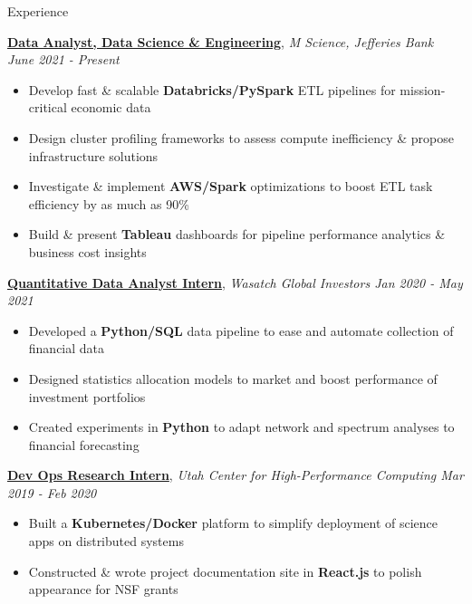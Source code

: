 \documentclass{resume/resume}
\begin{document}
\begin{rSection}{Experience}

    \href{https://mscience.com/}{\bf Data Analyst, Data Science \& Engineering}, {\em M Science, Jefferies Bank \hfill June 2021 - Present}
    \vspace{-6pt}
    \begin{itemize}[nosep]
        \item Develop fast \& scalable {\bf Databricks/PySpark} ETL pipelines for mission-critical economic data
        \item Design cluster profiling frameworks to assess compute inefficiency \& propose infrastructure solutions
        \item Investigate \& implement {\bf AWS/Spark} optimizations to boost ETL task efficiency by as much as 90\%
        \item Build \& present {\bf Tableau} dashboards for pipeline performance analytics \& business cost insights
    \end{itemize}

    \href{https://wasatchglobal.com/}{\bf Quantitative Data Analyst Intern}, {\em Wasatch Global Investors \hfill Jan 2020 - May 2021}
    \vspace{-6pt}
    \begin{itemize}[nosep]
        \item Developed a {\bf Python/SQL} data pipeline to ease and automate collection of financial data
        \item Designed statistics allocation models to market and boost performance of investment portfolios
        \item Created experiments in {\bf Python} to adapt network and spectrum analyses to financial forecasting
    \end{itemize}

    \href{https://slateci.io/}{\bf Dev Ops Research Intern}, {\em Utah Center for High-Performance Computing \hfill Mar 2019 - Feb 2020}
    \vspace{-6pt}
    \begin{itemize}[nosep]
        \item Built a {\bf Kubernetes/Docker} platform to simplify deployment of science apps on distributed systems
        \item Constructed \& wrote project documentation site in {\bf React.js} to polish appearance for NSF grants
    \end{itemize}
    

\end{rSection}
\end{document}
